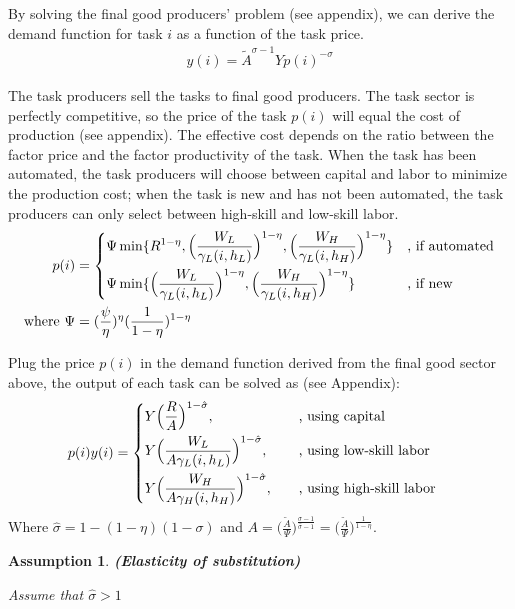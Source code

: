 \documentclass[12pt]{article}
\newtheorem{assumption}{Assumption}
\begin{document}
By solving the final good producers' problem (see appendix), we can derive the demand function for task $i$ as a function of the task price.
\begin{align*}
y(i) = \tilde{A}^{\sigma-1}Yp(i)^{-\sigma}
\end{align*}

The task producers sell the tasks to final good producers. The task sector is perfectly competitive, so the price of the task $p(i)$ will equal the cost of production (see appendix). The effective cost depends on the ratio between the factor price and the factor productivity of the task. When the task has been automated, the task producers will choose between capital and labor to minimize the production cost; when the task is new and has not been automated, the task producers can only select between high-skill and low-skill labor. 
\begin{align*}
p(i) &= 
\begin{dcases}
\Psi \min\{R^{1-\eta},\Big(\frac{W_L}{\gamma_L(i,h_L)}\Big)^{1-\eta},\Big(\frac{W_H}{\gamma_L(i,h_H)}\Big)^{1-\eta}\} &\text{, if automated}  \\
\Psi \min\{\Big(\frac{W_L}{\gamma_L(i,h_L)}\Big)^{1-\eta},\Big(\frac{W_H}{\gamma_L(i,h_H)}\Big)^{1-\eta}\} &\text{, if new}
\end{dcases} \\
\text{where } \Psi &= (\frac{\psi}{\eta})^{\eta}(\frac{1}{1-\eta})^{1-\eta}
\end{align*}

Plug the price $p(i)$ in the demand function derived from the final good sector above, the output of each task can be solved as (see Appendix): 
\begin{align*}
p(i)y(i) &= 
\begin{dcases}
Y\Big(\frac{R}{A}\Big)^{1-\hat{\sigma}}, &\quad  \text{, using capital}  \\
Y\Big(\frac{W_L}{A\gamma_L(i,h_L)}\Big)^{1-\hat{\sigma}}, &\quad  \text{, using low-skill labor}    \\
Y\Big(\frac{W_H}{A\gamma_H(i,h_H)}\Big)^{1-\hat{\sigma}}, &\quad  \text{, using high-skill labor} 
\end{dcases}
\end{align*}
Where $\hat{\sigma} = 1-(1-\eta)(1-\sigma)$ and $A = \Big(\frac{\tilde{A}}{\Psi}\Big)^{\frac{\sigma-1}{\hat{\sigma}-1}}  = \Big(\frac{\tilde{A}}{\Psi}\Big)^{\frac{1}{1-\eta}}$.

\begin{assumption}{\bf (Elasticity of substitution)}

Assume that $\hat{\sigma}>1$
\end{assumption}
\end{document}

